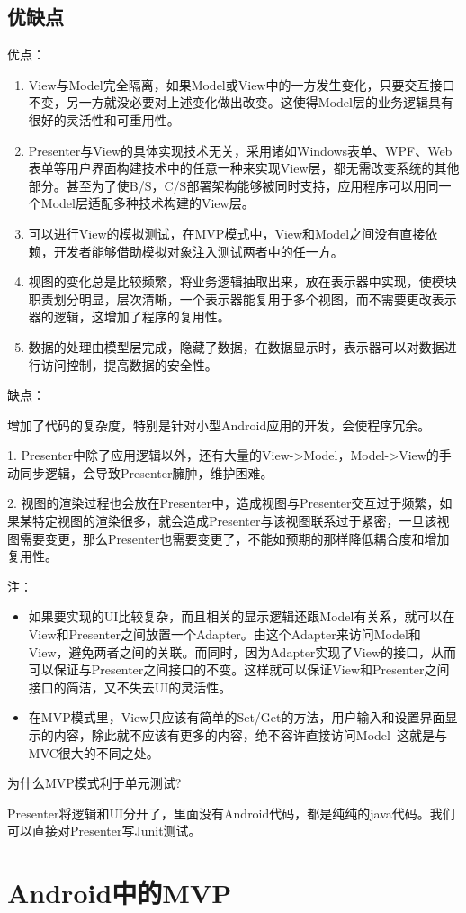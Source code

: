 \documentclass[a4paper,12pt]{ctexart}
\begin{document}
	\subsection{优缺点}
	优点：
	\begin{enumerate}
		\item View与Model完全隔离，如果Model或View中的一方发生变化，只要交互接口不变，另一方就没必要对上述变化做出改变。这使得Model层的业务逻辑具有很好的灵活性和可重用性。
		\item Presenter与View的具体实现技术无关，采用诸如Windows表单、WPF、Web表单等用户界面构建技术中的任意一种来实现View层，都无需改变系统的其他部分。甚至为了使B/S，C/S部署架构能够被同时支持，应用程序可以用同一个Model层适配多种技术构建的View层。
		\item 可以进行View的模拟测试，在MVP模式中，View和Model之间没有直接依赖，开发者能够借助模拟对象注入测试两者中的任一方。
		\item 视图的变化总是比较频繁，将业务逻辑抽取出来，放在表示器中实现，使模块职责划分明显，层次清晰，一个表示器能复用于多个视图，而不需要更改表示器的逻辑，这增加了程序的复用性。
		\item 数据的处理由模型层完成，隐藏了数据，在数据显示时，表示器可以对数据进行访问控制，提高数据的安全性。
	\end{enumerate}
	\par 缺点：
	\par 增加了代码的复杂度，特别是针对小型Android应用的开发，会使程序冗余。
	\par 1. Presenter中除了应用逻辑以外，还有大量的View->Model，Model->View的手动同步逻辑，会导致Presenter臃肿，维护困难。
	\par 2. 视图的渲染过程也会放在Presenter中，造成视图与Presenter交互过于频繁，如果某特定视图的渲染很多，就会造成Presenter与该视图联系过于紧密，一旦该视图需要变更，那么Presenter也需要变更了，不能如预期的那样降低耦合度和增加复用性。
	\par 注：
	\begin{itemize}
		\item 如果要实现的UI比较复杂，而且相关的显示逻辑还跟Model有关系，就可以在View和Presenter之间放置一个Adapter。由这个Adapter来访问Model和View，避免两者之间的关联。而同时，因为Adapter实现了View的接口，从而可以保证与Presenter之间接口的不变。这样就可以保证View和Presenter之间接口的简洁，又不失去UI的灵活性。
		\item 在MVP模式里，View只应该有简单的Set/Get的方法，用户输入和设置界面显示的内容，除此就不应该有更多的内容，绝不容许直接访问Model--这就是与MVC很大的不同之处。
	\end{itemize}
	为什么MVP模式利于单元测试?
	\par Presenter将逻辑和UI分开了，里面没有Android代码，都是纯纯的java代码。我们可以直接对Presenter写Junit测试。
	\section{Android中的MVP}
	
\end{document}
